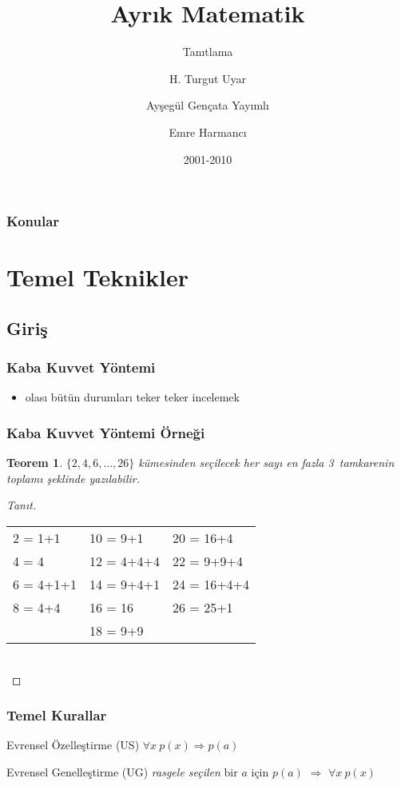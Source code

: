 \documentclass[dvipsnames]{beamer}
\title{Ayrık Matematik}
\subtitle{Tanıtlama}
\author{H. Turgut Uyar \and Ayşegül Gençata Yayımlı \and Emre Harmancı}
\date{2001-2010}
\theoremstyle{definition}
\theoremstyle{example}
\theoremstyle{plain}
\newtheorem{teorem}[theorem]{Teorem}
\begin{document}
\begin{frame}
  \titlepage
\end{frame}

\begin{frame}
  \frametitle{Konular}
  \tableofcontents
\end{frame}

\section{Temel Teknikler}

\subsection{Giriş}

\begin{frame}
  \frametitle{Kaba Kuvvet Yöntemi}

  \begin{itemize}
    \item olası bütün durumları teker teker incelemek
  \end{itemize}
\end{frame}

\begin{frame}
  \frametitle{Kaba Kuvvet Yöntemi Örneği}

  \begin{teorem}
    $\{2,4,6,\dots,26\}$ kümesinden seçilecek her sayı en fazla 3~tamkarenin
    toplamı şeklinde yazılabilir.
  \end{teorem}

  \pause
  \begin{proof}[Tanıt]
    \begin{tabular}{lll}
      2 = 1+1   & 10 = 9+1    & 20 = 16+4\\
      4 = 4     & 12 = 4+4+4  & 22 = 9+9+4\\
      6 = 4+1+1 & 14 = 9+4+1  & 24 = 16+4+4\\
      8 = 4+4   & 16 = 16     & 26 = 25+1\\
                & 18 = 9+9    &
    \end{tabular}\\
  \end{proof}
\end{frame}

\begin{frame}
  \frametitle{Temel Kurallar}

  \begin{block}{Evrensel Özelleştirme (US)}
    $\forall x~p(x) \Rightarrow p(a)$
  \end{block}

  \pause
  \begin{block}{Evrensel Genelleştirme (UG)}
    \emph{rasgele seçilen} bir $a$ için $p(a)$
      $\Rightarrow$ $\forall x~p(x)$
  \end{block}
\end{frame}
\end{document}
